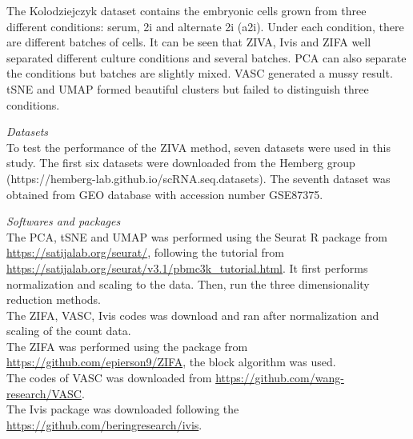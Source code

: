 The Kolodziejczyk dataset contains the embryonic cells grown from three different conditions: serum, 2i and alternate 2i (a2i). Under each condition, there are different batches of cells. It can be seen that ZIVA, Ivis and ZIFA well separated different culture conditions and several batches. PCA can also separate the conditions but batches are slightly mixed. VASC generated a mussy result. tSNE and UMAP formed beautiful clusters but failed to distinguish three conditions.

\vspace{0.5cm}
\noindent\emph{Datasets} \\
To test the performance of the ZIVA method, seven datasets were used in this study. The first six datasets were downloaded from the Hemberg group (https://hemberg-lab.github.io/scRNA.seq.datasets). The seventh dataset was obtained from GEO database with accession number GSE87375.

\vspace{0.5cm}
\noindent\emph{Softwares and packages} \\
The PCA, tSNE and UMAP was performed using the Seurat R package from \url{https://satijalab.org/seurat/}, following the tutorial from \url{https://satijalab.org/seurat/v3.1/pbmc3k_tutorial.html}. It first performs normalization and scaling to the data. Then, run the three dimensionality reduction methods.\\
The ZIFA, VASC, Ivis codes was download and ran after normalization and scaling of the count data.\\
The ZIFA was performed using the package from \url{https://github.com/epierson9/ZIFA}, the block algorithm was used.\\
The codes of VASC was downloaded from \url{https://github.com/wang-research/VASC}.\\
The Ivis package was downloaded following the \url{https://github.com/beringresearch/ivis}.


